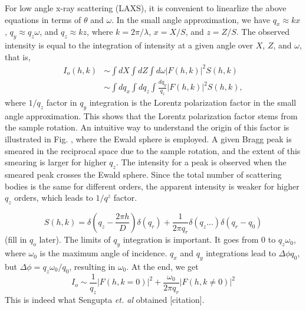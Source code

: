 \documentclass[12pt,letterpaper]{article}
\begin{document}
For low angle x-ray scattering (LAXS), it is convenient to linearlize the above
equations in terms of $\theta$ and $\omega$. In the small angle approximation, 
we have $q_x \approx kx$, $q_y \approx q_z\omega$, and $q_z \approx kz$, where
$k=2\pi/\lambda$, $x=X/S$, and $z=Z/S$. The observed intensity is equal to
the integration of intensity at a given angle over $X$, $Z$, and $\omega$, 
that is, 
\begin{align}
  I_o(h,k) &\sim \int dX \int dZ \int d\omega |F(h,k)|^2 S(h,k) \nonumber \\
           &\sim \int dq_x \int dq_z \int \frac{dq_y}{q_z} |F(h,k)|^2 S(h,k),
\end{align}
where $1/q_z$ factor in $q_y$ integration is the Lorentz polarization factor
in the small angle approximation. This shows that the Lorentz polarization 
factor stems from the sample rotation. An intuitive way to understand the
origin of this factor is illustrated in Fig. , where the Ewald sphere 
is employed. A given Bragg peak is smeared in the reciprocal space due to 
the sample rotation, and the extent of this smearing is larger for 
higher $q_z$. The intensity for a peak is observed when the smeared peak
crosses the Ewald sphere. Since the total number of scattering bodies 
is the same for different orders, the apparent intensity is weaker for
higher $q_z$ orders, which leads to $1/q^z$ factor.

\begin{equation}
  S(h,k) = \delta(q_z-\frac{2\pi h}{D})\delta(q_r) + \frac{1}{2\pi q_r}\delta(q_z...)\delta(q_r-q_0)
\end{equation} 
(fill in $q_o$ later). The limits of $q_y$ integration is important. It goes
from 0 to $q_z\omega_0$, where $\omega_0$ is the maximum angle of incidence. 
$q_x$ and $q_y$ integrations lead to $\Delta\phi q_0$, but $\Delta\phi = q_z\omega_0/q_0$,
resulting in $\omega_0$. At the end, we get
\begin{equation}
  I_o \sim \frac{1}{q_z}|F(h,k=0)|^2+\frac{\omega_0}{2\pi q_r}|F(h,k\neq 0)|^2
\end{equation}
This is indeed what Sengupta \textit{et. al} obtained [citation].
\end{document}
